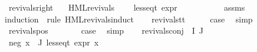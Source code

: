 \begin{isabellebody}
\isamarkupfalse%
\ revivals{\isacharunderscore}{\kern0pt}right{\isacharcolon}{\kern0pt}\isanewline
\ \ \ {\isachardoublequoteopen}HML{\isacharunderscore}{\kern0pt}revivals\ {\isasymphi}{\isachardoublequoteclose}\isanewline
\ \ \ {\isachardoublequoteopen}less{\isacharunderscore}{\kern0pt}eq{\isacharunderscore}{\kern0pt}t\ {\isacharparenleft}{\kern0pt}expr\ {\isasymphi}{\isacharparenright}{\kern0pt}\ {\isacharparenleft}{\kern0pt}{\isasyminfinity}{\isacharcomma}{\kern0pt}\ {}{\isacharcomma}{\kern0pt}\ {}{\isacharcomma}{\kern0pt}\ {}{\isacharcomma}{\kern0pt}\ {}{\isacharcomma}{\kern0pt}\ {}{\isacharparenright}{\kern0pt}{\isachardoublequoteclose}\isanewline
%
\isadelimproof
\ \ %
\endisadelimproof
%
\isatagproof
{}\isamarkupfalse%
\ assms\isanewline
{}\isamarkupfalse%
{\isacharparenleft}{\kern0pt}induction\ {\isasymphi}\ rule{\isacharcolon}{\kern0pt}\ HML{\isacharunderscore}{\kern0pt}revivals{\isachardot}{\kern0pt}induct{\isacharparenright}{\kern0pt}\isanewline
\ \ \isamarkupfalse%
\ revivals{\isacharunderscore}{\kern0pt}tt\isanewline
\ \ \isamarkupfalse%
\ \isamarkupfalse%
\ {\isacharquery}{\kern0pt}case\ \isamarkupfalse%
\ simp\isanewline
{}\isamarkupfalse%
\isanewline
\ \ \isamarkupfalse%
\ {\isacharparenleft}{\kern0pt}revivals{\isacharunderscore}{\kern0pt}pos\ {\isasymphi}\ {\isasymalpha}{\isacharparenright}{\kern0pt}\isanewline
\ \ \isamarkupfalse%
\ \isamarkupfalse%
\ {\isacharquery}{\kern0pt}case\ \isamarkupfalse%
\ simp\isanewline
{}\isamarkupfalse%
\isanewline
\ \ \isamarkupfalse%
\ {\isacharparenleft}{\kern0pt}revivals{\isacharunderscore}{\kern0pt}conj\ {\isasymPhi}\ I\ J{\isacharparenright}{\kern0pt}\isanewline
\ \ \isamarkupfalse%
\ neg{\isacharcolon}{\kern0pt}\ {\isachardoublequoteopen}{\isasymforall}x{\isasymin}{\isasymPhi}\ {\isacharbackquote}{\kern0pt}\ J{\isachardot}{\kern0pt}\ less{\isacharunderscore}{\kern0pt}eq{\isacharunderscore}{\kern0pt}t\ {\isacharparenleft}{\kern0pt}expr\ x{\isacharparenright}{\kern0pt}\ {\isacharparenleft}{\kern0pt}{}{\isacharcomma}{\kern0pt}\ {}{\isacharcomma}{\kern0pt}\ {}{\isacharcomma}{\kern0pt}\ {}{\isacharcomma}{\kern0pt}\ {}{\isacharcomma}{\kern0pt}\ {}{\isacharparenright}{\kern0pt}{\isachardoublequoteclose}\isanewline

\end{isabellebody}
